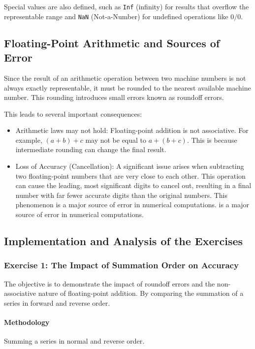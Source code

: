 Special values are also defined, such as \verb|Inf| (infinity) for results that overflow the representable range and \verb|NaN| (Not-a-Number) for undefined operations like $0/0$.

\subsection{Floating-Point Arithmetic and Sources of Error}
Since the result of an arithmetic operation between two machine numbers is not always exactly representable, it must be rounded to the nearest available machine number. This rounding introduces small errors known as roundoff errors.

This leads to several important consequences:
\begin{itemize}
    \item Arithmetic laws may not hold: Floating-point addition is not associative. For example, $(a + b) + c$ may not be equal to $a + (b + c)$. This is because intermediate rounding can change the final result.
    \item Loss of Accuracy (Cancellation): A significant issue arises when subtracting two floating-point numbers that are very close to each other. This operation can cause the leading, most significant digits to cancel out, resulting in a final number with far fewer accurate digits than the original numbers. This phenomenon is a major source of error in numerical computations. is a major source of error in numerical computations.
\end{itemize}


\subsection{Implementation and Analysis of the Exercises}

\subsubsection{Exercise 1: The Impact of Summation Order on Accuracy}
The objective is to demonstrate the impact of roundoff errors and the non-associative nature of floating-point addition. By comparing the summation of a series in forward and reverse order.

\paragraph{Methodology} Summing a series in normal and reverse order.


